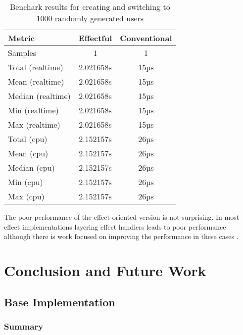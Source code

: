 \documentclass[logo,bsc,singlespacing,parskip]{infthesis}
\begin{document}
\begin{table}[H]
    \centering
    \begin{tabular}{lcc}
        \toprule
        \textbf{Metric} & \textbf{Effectful} & \textbf{Conventional} \\
        \midrule
        Samples           & 1                  & 1 \\
        \midrule
        Total (realtime)  & 2.021658s          & 15µs \\
        Mean (realtime)   & 2.021658s          & 15µs \\
        Median (realtime) & 2.021658s          & 15µs \\
        Min (realtime)    & 2.021658s          & 15µs \\
        Max (realtime)    & 2.021658s          & 15µs \\
        \midrule
        Total (cpu)       & 2.152157s          & 26µs \\
        Mean (cpu)        & 2.152157s          & 26µs \\
        Median (cpu)      & 2.152157s          & 26µs \\
        Min (cpu)         & 2.152157s          & 26µs \\
        Max (cpu)         & 2.152157s          & 26µs \\
        \bottomrule
    \end{tabular}
    \caption{Benchark results for creating and switching to 1000 randomly generated users}
    \label{tab:label_comparison}
  \end{table}

The poor performance of the effect oriented version is not surprising. In most
effect implementations layering effect handlers leads to poor performance
although there is work focused on improving the performance in these cases \cite{efficient-effects} \cite{koka2023} \cite{compilation2023}.

\chapter{Conclusion and Future Work}

\section{Base Implementation}

\subsection{Summary}
\end{document}
